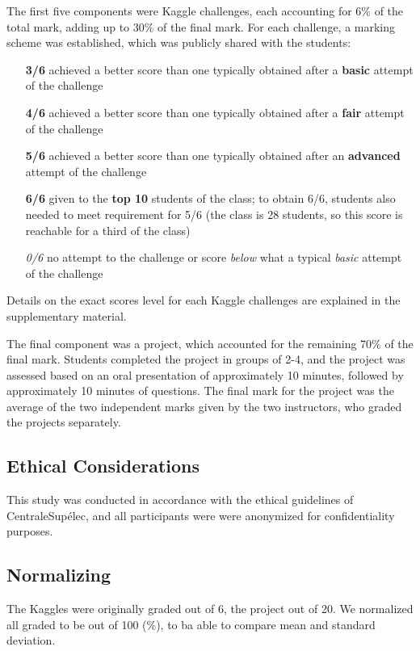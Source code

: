 \documentclass[a4paper]{article}
\begin{document}
The first five components were Kaggle challenges, each accounting for 6\% of the total mark, adding up to 30\% of the final mark.
For each challenge, a marking scheme was established, which was publicly shared with the students:
\begin{itemize}
	\item [\textbf{3/6}] achieved a better score than one typically obtained after a \textbf{basic} attempt of the challenge
	\item [\textbf{4/6}] achieved a better score than one typically obtained after a \textbf{fair} attempt of the challenge
	\item [\textbf{5/6}] achieved a better score than one typically obtained after an \textbf{advanced} attempt of the challenge
	\item [\textbf{6/6}] given to the \textbf{top 10} students of the class; to obtain 6/6, students also needed to meet requirement for 5/6 (the class is 28 students, so this score is reachable for a third of the class)
	\item [\textit{0/6}] no attempt to the challenge or score \textit{below} what a typical \textit{basic} attempt of the challenge
\end{itemize}
Details on the exact scores level for each Kaggle challenges are explained in the supplementary material.

The final component was a project, which accounted for the remaining 70\% of the final mark.
Students completed the project in groups of 2-4, and the project was assessed based on an oral presentation of approximately 10 minutes, followed by approximately 10 minutes of questions.
The final mark for the project was the average of the two independent marks given by the two instructors, who graded the projects separately.

\subsection{Ethical Considerations}
This study was conducted in accordance with the ethical guidelines of CentraleSupélec, and all participants were were anonymized for confidentiality purposes.

\subsection{Normalizing}
The Kaggles were originally graded out of 6, the project out of 20.
We normalized all graded to be out of 100 (\%), to ba able to compare mean and standard deviation.
\end{document}

